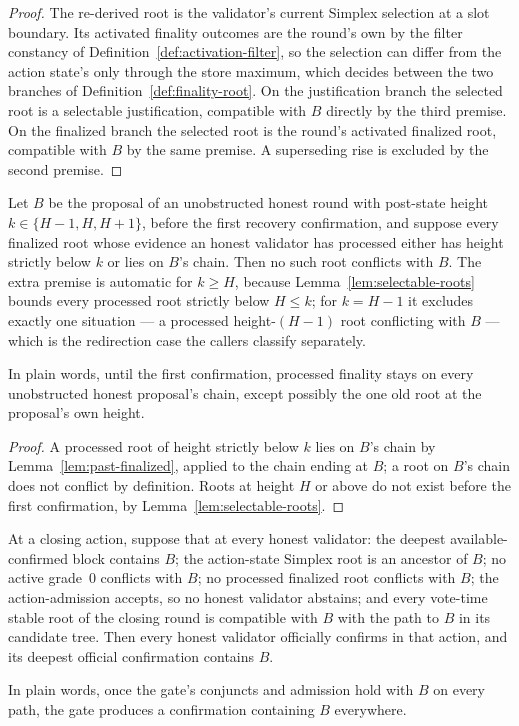 \begin{proof}
The re-derived root is the validator's current Simplex selection at a
slot boundary.  Its activated finality outcomes are the round's own by
the filter constancy of Definition~\ref{def:activation-filter}, so the
selection can differ from the action state's only through the store
maximum, which decides between the two branches of
Definition~\ref{def:finality-root}.  On the justification branch the
selected root is a selectable justification, compatible with \(B\)
directly by the third premise.  On the finalized branch the selected
root is the
round's activated finalized root, compatible with \(B\) by the same
premise.  A
superseding rise is excluded by the second premise.
\end{proof}

\begin{lemma}
\label{lem:pre-confirmation-finality-compatible}
Let \(B\) be the proposal of an unobstructed honest round with
post-state height \(k\in\{H-1,H,H+1\}\), before the first recovery
confirmation, and suppose every finalized root whose evidence an honest
validator has processed either has height strictly below \(k\) or
lies on \(B\)'s chain.  Then no such root conflicts with \(B\).
The extra premise is automatic for \(k\geq H\), because
Lemma~\ref{lem:selectable-roots} bounds every processed root strictly
below \(H\leq k\); for \(k=H-1\) it excludes exactly one
situation --- a processed height-\((H-1)\) root conflicting with
\(B\) --- which is the redirection case the callers classify
separately.

In plain words, until the first confirmation, processed finality stays
on every unobstructed honest proposal's chain, except possibly the one
old root at the proposal's own height.
\end{lemma}

\begin{proof}
A processed root of height strictly below \(k\) lies on \(B\)'s
chain by Lemma~\ref{lem:past-finalized}, applied to the chain ending
at \(B\); a root on \(B\)'s chain does not conflict by definition.
Roots at height \(H\) or above do not exist before the first
confirmation, by Lemma~\ref{lem:selectable-roots}.
\end{proof}

\begin{lemma}
\label{lem:gate-closure}
At a closing action, suppose that at every honest validator: the deepest
available-confirmed block contains \(B\); the action-state Simplex
root is an ancestor of \(B\); no active grade~0 conflicts with
\(B\); no processed finalized root conflicts with \(B\); the
action-admission accepts, so no honest validator abstains; and every
vote-time stable root of the closing round is compatible with \(B\)
with the path to \(B\) in its candidate tree.  Then every honest
validator officially confirms in that action, and its deepest official
confirmation contains \(B\).

In plain words, once the gate's conjuncts and admission hold with
\(B\) on every path, the gate produces a confirmation containing
\(B\) everywhere.
\end{lemma}


